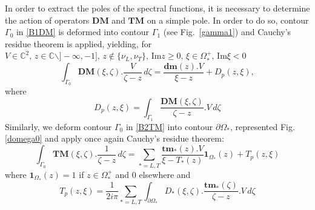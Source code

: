In order to extract the poles of the spectral functions, it is necessary to determine the action of operators $\mathbf{DM}$ and $\mathbf{TM}$ on a simple pole. In order to do so, contour $\Gamma_0$ in \eqref{B1DM} is deformed into contour $\Gamma_1$ (see Fig.~\ref{gamma1}) and Cauchy's residue theorem is applied, yielding, for
$ V\in\mathbb{C}^2, \, z\in \mathbb{C} \backslash  \rbrack - \infty, -1 \rbrack , \,  z \notin \{\nu_L,\nu_T \}, \, \mbox{Im} z \geq 0, \, \xi \in \Omega_*^+, \, \mbox{Im} \xi <0 $
\begin{equation}
\int_{\Gamma_0} \textbf{DM}(\xi,\zeta).\frac{V}{\zeta-z}\,d\zeta = \frac{\textbf{dm}(z).V}{\xi-z}+D_p(z,\xi),
\label{GaussDM}
\end{equation}
where
\begin{equation}
D_p(z,\xi)= \int_{\Gamma_1} \frac{\textbf{DM}(\xi,\zeta)}{\zeta-z}.V\,d\zeta
\label{C3:defDp}
\end{equation}
Similarly, we deform contour $\Gamma_0$ in \eqref{B2TM} into contour $\partial \Omega_*$, represented Fig. \ref{domega0} and apply once again Cauchy's residue theorem:
\begin{equation}
\int_{\Gamma_0} \textbf{TM}(\xi,\zeta).\frac{1}{\zeta-z}\,d\zeta = \sum_{*=L,T} \frac{\textbf{tm}_*(z).V}{\xi-T_*(z)}\textbf{1}_{\Omega_*}(z)+T_p(z,\xi)
\label{GaussTM}
\end{equation}
where $\textbf{1}_{\Omega_*}(z)=1$ if $z\in\Omega_*^+$ and $0$ elsewhere and
\begin{equation}
T_p(z,\xi)= \frac{1}{2i\pi} \sum_{*=L,T} \int_{\partial \Omega_*} D_*(\xi,\zeta) .\frac{\textbf{tm}_*(\zeta)}{\zeta-z}.V\, d\zeta
\label{C3:defTp}
\end{equation}


